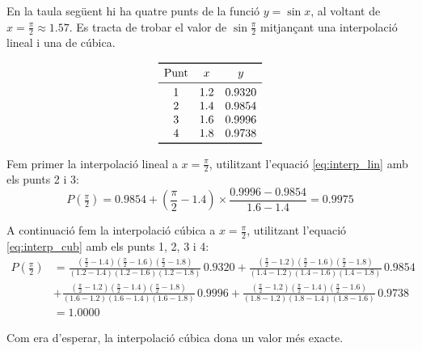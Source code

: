 \begin{exemple}\label{ex:InterpLinCub}
	\addcontentsxms{\InterpLinCub}
    En la taula següent hi ha quatre punts de la funció $y = \sin x$, al voltant de $x=\frac{\pi}{2}\approx\num{1,57}$. Es tracta de trobar el valor de $\sin \frac{\pi}{2}$ mitjançant una interpolació lineal i una de cúbica.
    \vspace{-8mm}
    \begin{center}
        \[\begin{array}{ccc}
           \toprule[1pt]
              \text{Punt} & x  & y \\
           \midrule
              1 & \num{1,2} & \num{0,9320} \\
              2 & \num{1,4} & \num{0,9854} \\
              3 & \num{1,6} & \num{0,9996} \\
              4 & \num{1,8} & \num{0,9738} \\
           \bottomrule[1pt]
        \end{array} \]
    \end{center}

    Fem primer la interpolació lineal a $x= \frac{\pi}{2}$, utilitzant l'equació \eqref{eq:interp_lin} amb els punts 2 i 3:
    \[ P\left(\tfrac{\pi}{2}\right) = \num{0,9854}+\left(\frac{\pi}{2}-\num{1,4}\right)\times\frac{\num{0,9996}-\num{0,9854}}{\num{1,6}-\num{1,4}}=
    \num{0,9975} \]

    A continuació fem la interpolació cúbica a $x= \frac{\pi}{2}$, utilitzant l'equació \eqref{eq:interp_cub} amb els punts 1, 2, 3 i 4:
    \[\begin{split}
      P\left(\tfrac{\pi}{2}\right) &= \frac{(\tfrac{\pi}{2}-\num{1,4})(\tfrac{\pi}{2}-\num{1,6})(\tfrac{\pi}{2}-\num{1,8})}{(\num{1,2}-\num{1,4})(\num{1,2}-\num{1,6})(\num{1,2}-\num{1,8})}\, \num{0,9320} +
              \frac{(\tfrac{\pi}{2}-\num{1,2})(\tfrac{\pi}{2}-\num{1,6})(\tfrac{\pi}{2}-\num{1,8})}{(\num{1,4}-\num{1,2})(\num{1,4}-\num{1,6})(\num{1,4}-\num{1,8})}\, \num{0,9854}  \\[1.5ex]
           &+ \frac{(\tfrac{\pi}{2}-\num{1,2})(\tfrac{\pi}{2}-\num{1,4})(\tfrac{\pi}{2}-\num{1,8})}{(\num{1,6}-\num{1,2})(\num{1,6}-\num{1,4})(\num{1,6}-\num{1,8})}\, \num{0,9996}+
              \frac{(\tfrac{\pi}{2}-\num{1,2})(\tfrac{\pi}{2}-\num{1,4})(\tfrac{\pi}{2}-\num{1,6})}{(\num{1,8}-\num{1,2})(\num{1,8}-\num{1,4})(\num{1,8}-\num{1,6})}\, \num{0,9738}  \\[1.5ex]
           &= \num{1,0000}
    \end{split}\]


    Com era d'esperar, la interpolació cúbica dona un valor més exacte.
\end{exemple}

